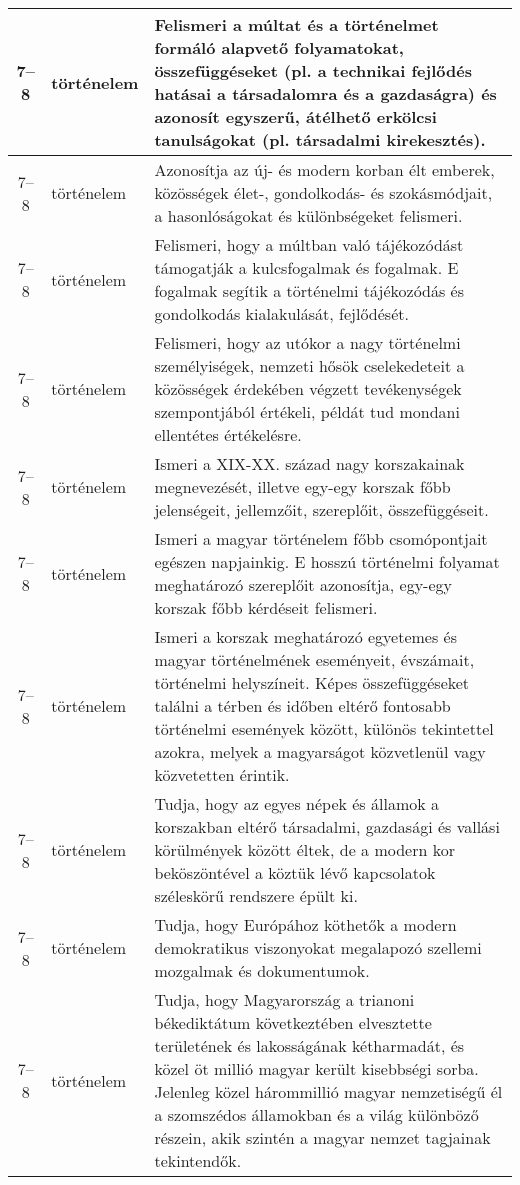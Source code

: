 \begin{small}
\begin{longtable}{c | p{2cm} |  p{11cm} }
              7--8 & történelem & Felismeri a múltat és a történelmet formáló alapvető folyamatokat, összefüggéseket (pl. a technikai fejlődés hatásai a társadalomra és a gazdaságra) és azonosít egyszerű, átélhető erkölcsi tanulságokat (pl. társadalmi kirekesztés). \\ \hline
              7--8 & történelem & Azonosítja az új- és modern korban élt emberek, közösségek élet-, gondolkodás- és szokásmódjait, a hasonlóságokat és különbségeket felismeri.
 \\ \hline
              7--8 & történelem & Felismeri, hogy a múltban való tájékozódást támogatják a kulcsfogalmak és fogalmak. E fogalmak segítik a történelmi tájékozódás és gondolkodás kialakulását, fejlődését. \\ \hline
              7--8 & történelem & Felismeri, hogy az utókor a nagy történelmi személyiségek, nemzeti hősök cselekedeteit a közösségek érdekében végzett tevékenységek szempontjából értékeli, példát tud mondani ellentétes értékelésre. \\ \hline
              7--8 & történelem & Ismeri a XIX-XX. század nagy korszakainak megnevezését, illetve egy-egy korszak főbb jelenségeit, jellemzőit, szereplőit, összefüggéseit. \\ \hline
              7--8 & történelem & Ismeri a magyar történelem főbb csomópontjait egészen napjainkig. E hosszú történelmi folyamat meghatározó szereplőit azonosítja, egy-egy korszak főbb kérdéseit felismeri. \\ \hline
              7--8 & történelem & Ismeri a korszak meghatározó egyetemes és magyar történelmének eseményeit, évszámait, történelmi helyszíneit. Képes összefüggéseket találni a térben és időben eltérő fontosabb történelmi események között, különös tekintettel azokra, melyek a magyarságot közvetlenül vagy közvetetten érintik. \\ \hline
              7--8 & történelem & Tudja, hogy az egyes népek és államok a korszakban eltérő társadalmi, gazdasági és vallási körülmények között éltek, de a modern kor beköszöntével a köztük lévő kapcsolatok széleskörű rendszere épült ki. \\ \hline
              7--8 & történelem & Tudja, hogy Európához köthetők a modern demokratikus viszonyokat megalapozó szellemi mozgalmak és dokumentumok. \\ \hline
              7--8 & történelem & Tudja, hogy Magyarország a trianoni békediktátum következtében elvesztette területének és lakosságának kétharmadát, és közel öt millió magyar került kisebbségi sorba. Jelenleg közel hárommillió magyar nemzetiségű él a szomszédos államokban és a világ különböző részein, akik szintén a magyar nemzet tagjainak tekintendők. \\ \hline

\end{longtable}
\end{small}
